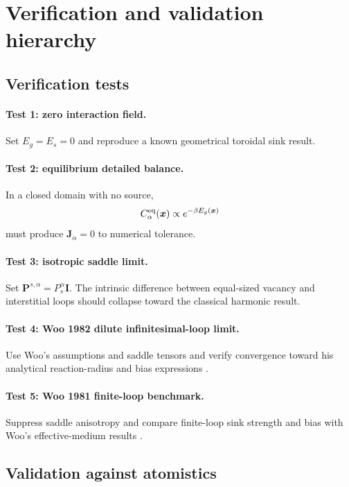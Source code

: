 \documentclass[11pt]{article}
\newcommand{\bJ}{\bm{J}}
\newcommand{\bP}{\bm{P}}
\newcommand{\bx}{\bm{x}}
\begin{document}
\section{Verification and validation hierarchy}
\subsection{Verification tests}
\paragraph{Test 1: zero interaction field.}
Set $E_g=E_s=0$ and reproduce a known geometrical toroidal sink result.

\paragraph{Test 2: equilibrium detailed balance.}
In a closed domain with no source,
\begin{equation}
C_\alpha^{\rm eq}(\bx)\propto e^{-\beta E_g(\bx)}
\end{equation}
must produce $\bJ_\alpha=0$ to numerical tolerance.

\paragraph{Test 3: isotropic saddle limit.}
Set $\bP^{s,\alpha}=P_s^\alpha\bm I$. The intrinsic difference between equal-sized vacancy and interstitial loops should collapse toward the classical harmonic result.

\paragraph{Test 4: Woo 1982 dilute infinitesimal-loop limit.}
Use Woo's assumptions and saddle tensors and verify convergence toward his analytical reaction-radius and bias expressions \cite{Woo1982}.

\paragraph{Test 5: Woo 1981 finite-loop benchmark.}
Suppress saddle anisotropy and compare finite-loop sink strength and bias with Woo's effective-medium results \cite{Woo1981}.

\subsection{Validation against atomistics}
\end{document}
